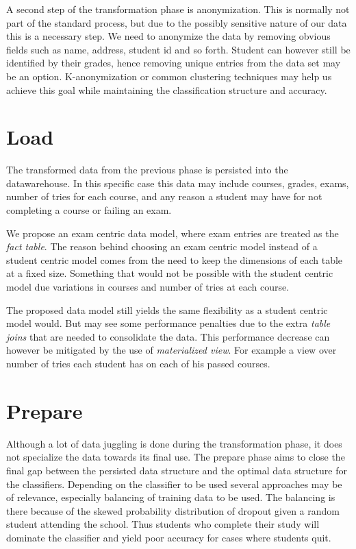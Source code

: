 \bigskip\noindent
A second step of the transformation phase is anonymization. 
This is normally not part of the standard process, but due to the possibly sensitive nature of our data this is a necessary step.
We need to anonymize the data by removing obvious fields such as name, address, student id and so forth. 
Student can however still be identified by their grades, hence removing unique entries from the data set may be an option.
K-anonymization or common clustering techniques may help us achieve this goal while maintaining the classification structure and accuracy.

\section{Load}
The transformed data from the previous phase is persisted into the datawarehouse. 
In this specific case this data may include courses, grades, exams, number of tries for each course, 
and any reason a student may have for not completing a course or failing an exam.

\bigskip\noindent
We propose an exam centric data model, where exam entries are treated as the \textit{fact table}. 
The reason behind choosing an exam centric model instead of a student centric model comes from the
need to keep the dimensions of each table at a fixed size. Something that would not be possible 
with the student centric model due variations in courses and number of tries at each course.

The proposed data model still yields the same flexibility as a student centric model would. 
But may see some performance penalties due to the extra \textit{table joins} that are needed to consolidate the data.
This performance decrease can however be mitigated by the use of \textit{materialized view}.
For example a view over number of tries each student has on each of his passed courses.

\section{Prepare}
Although a lot of data juggling is done during the transformation phase, it does not specialize the data towards its final use. 
The prepare phase aims to close the final gap between the persisted data structure and the optimal data structure for the classifiers.
Depending on the classifier to be used several approaches may be of relevance, especially balancing of training data to be used.
The balancing is there because of the skewed probability distribution of dropout given a random student attending the school.
Thus students who complete their study will dominate the classifier and yield poor accuracy for cases where students quit.

